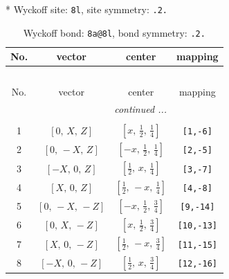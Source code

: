 \documentclass[fleqn,8pt]{jsarticle}
\begin{document}
* Wyckoff site: {\tt 8l}, site symmetry: {\tt .2.}
\renewcommand{\arraystretch}{1.2}
\begin{longtable}{cccc}
\caption{Wyckoff bond: {\tt 8a@8l}, bond symmetry: {\tt .2.}}
 \\
 \hline \hline
No. & vector & center & mapping \\ \hline \endfirsthead

\multicolumn{3}{l}{\tablename\ \thetable{}} \\
 \hline \hline
No. & vector & center & mapping \\ \hline \endhead

 \hline \hline
\multicolumn{3}{r}{\footnotesize\it continued ...} \\ \endfoot

 \hline \hline
\multicolumn{3}{r}{} \\ \endlastfoot

1 & $\left[ 0,\, X,\, Z \right]$ & $\left[ x,\, \frac{1}{2},\, \frac{1}{4} \right]$ & {\tt [1,-6]} \\ \hline
2 & $\left[ 0,\, - X,\, Z \right]$ & $\left[ - x,\, \frac{1}{2},\, \frac{1}{4} \right]$ & {\tt [2,-5]} \\ \hline
3 & $\left[ - X,\, 0,\, Z \right]$ & $\left[ \frac{1}{2},\, x,\, \frac{1}{4} \right]$ & {\tt [3,-7]} \\ \hline
4 & $\left[ X,\, 0,\, Z \right]$ & $\left[ \frac{1}{2},\, - x,\, \frac{1}{4} \right]$ & {\tt [4,-8]} \\ \hline
5 & $\left[ 0,\, - X,\, - Z \right]$ & $\left[ - x,\, \frac{1}{2},\, \frac{3}{4} \right]$ & {\tt [9,-14]} \\ \hline
6 & $\left[ 0,\, X,\, - Z \right]$ & $\left[ x,\, \frac{1}{2},\, \frac{3}{4} \right]$ & {\tt [10,-13]} \\ \hline
7 & $\left[ X,\, 0,\, - Z \right]$ & $\left[ \frac{1}{2},\, - x,\, \frac{3}{4} \right]$ & {\tt [11,-15]} \\ \hline
8 & $\left[ - X,\, 0,\, - Z \right]$ & $\left[ \frac{1}{2},\, x,\, \frac{3}{4} \right]$ & {\tt [12,-16]} \\
\end{longtable}
\renewcommand{\arraystretch}{1.2}
\end{document}

